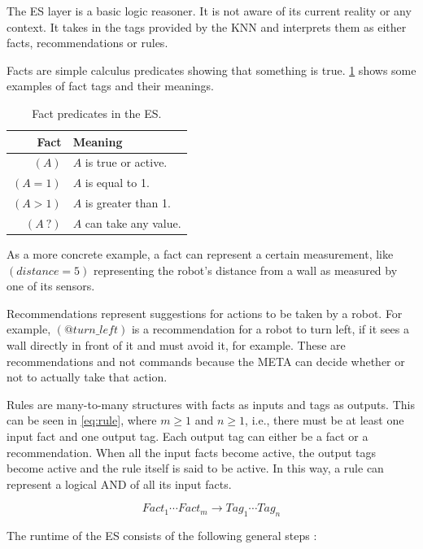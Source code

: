 \documentclass[titlepage,11pt]{article}
\begin{document}
The ES layer is a basic logic reasoner. It is not aware of its current reality or any context. It takes in the tags provided by the KNN and interprets them as either facts, recommendations or rules.

Facts are simple calculus predicates showing that something is true. \cref{table:fact_predicates} shows some examples of fact tags and their meanings.

\begin{table}[!htb]
	\centering
	\caption{Fact predicates in the ES.}
	\begin{tabular}{r | l}
		\textbf{Fact} & \textbf{Meaning} \\ \hline
		$(A)$ & $A$ is true or active.\\
		$(A = 1)$ & $A$ is equal to 1. \\
		$(A > 1)$ & $A$ is greater than 1. \\
		$(A \ ?)$ & $A$ can take any value.
	\end{tabular}
	\label{table:fact_predicates}
\end{table}

As a more concrete example, a fact can represent a certain measurement, like $(distance = 5)$ representing the robot's distance from a wall as measured by one of its sensors.

Recommendations represent suggestions for actions to be taken by a robot. For example, $(@turn\_left)$ is a recommendation for a robot to turn left, if it sees a wall directly in front of it and must avoid it, for example. These are recommendations and not commands because the META can decide whether or not to actually take that action.


Rules are many-to-many structures with facts as inputs and tags as outputs. This can be seen in \autoref{eq:rule}, where $m \geq 1$ and $n \geq 1$, i.e., there must be at least one input fact and one output tag. Each output tag can either be a fact or a recommendation. When all the input facts become active, the output tags become active and the rule itself is said to be active. In this way, a rule can represent a logical AND of all its input facts.

\begin{equation} \label{eq:rule}
Fact_1 \cdots Fact_m \rightarrow Tag_1 \cdots Tag_n
\end{equation}

The runtime of the ES consists of the following general steps \cite{vybihal-expert}:
\end{document}
